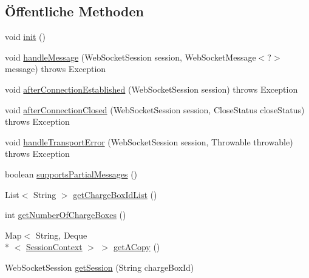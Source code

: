 \subsection*{Öffentliche Methoden}
\begin{DoxyCompactItemize}
\item 
void \hyperlink{classde_1_1rwth_1_1idsg_1_1steve_1_1ocpp_1_1ws_1_1_abstract_web_socket_endpoint_aef8362bd31120ca281b31b0e929b57d0}{init} ()
\item 
void \hyperlink{classde_1_1rwth_1_1idsg_1_1steve_1_1ocpp_1_1ws_1_1_abstract_web_socket_endpoint_af08f9d5fea93c492fa8a6e97f8131ccd}{handle\+Message} (Web\+Socket\+Session session, Web\+Socket\+Message$<$?$>$ message)  throws Exception 
\item 
void \hyperlink{classde_1_1rwth_1_1idsg_1_1steve_1_1ocpp_1_1ws_1_1_abstract_web_socket_endpoint_adc20166385a1af5646716aa0f6414f85}{after\+Connection\+Established} (Web\+Socket\+Session session)  throws Exception 
\item 
void \hyperlink{classde_1_1rwth_1_1idsg_1_1steve_1_1ocpp_1_1ws_1_1_abstract_web_socket_endpoint_aef2d9df6496b49e2981c3253760b2d69}{after\+Connection\+Closed} (Web\+Socket\+Session session, Close\+Status close\+Status)  throws Exception 
\item 
void \hyperlink{classde_1_1rwth_1_1idsg_1_1steve_1_1ocpp_1_1ws_1_1_abstract_web_socket_endpoint_a80a5c510b03fa4ce60c6642b9ad2c47d}{handle\+Transport\+Error} (Web\+Socket\+Session session, Throwable throwable)  throws Exception 
\item 
boolean \hyperlink{classde_1_1rwth_1_1idsg_1_1steve_1_1ocpp_1_1ws_1_1_abstract_web_socket_endpoint_ababd333016df11a6eb243cf87c27e329}{supports\+Partial\+Messages} ()
\item 
List$<$ String $>$ \hyperlink{classde_1_1rwth_1_1idsg_1_1steve_1_1ocpp_1_1ws_1_1_abstract_web_socket_endpoint_a8368ec501a410320c3725880bf79829e}{get\+Charge\+Box\+Id\+List} ()
\item 
int \hyperlink{classde_1_1rwth_1_1idsg_1_1steve_1_1ocpp_1_1ws_1_1_abstract_web_socket_endpoint_a863df404cd75c4804d6366076bef8b0a}{get\+Number\+Of\+Charge\+Boxes} ()
\item 
Map$<$ String, Deque\\*
$<$ \hyperlink{classde_1_1rwth_1_1idsg_1_1steve_1_1ocpp_1_1ws_1_1data_1_1_session_context}{Session\+Context} $>$ $>$ \hyperlink{classde_1_1rwth_1_1idsg_1_1steve_1_1ocpp_1_1ws_1_1_abstract_web_socket_endpoint_aef16fcbbf0c31be46115c81fc0738837}{get\+A\+Copy} ()
\item 
Web\+Socket\+Session \hyperlink{classde_1_1rwth_1_1idsg_1_1steve_1_1ocpp_1_1ws_1_1_abstract_web_socket_endpoint_afa20f380a780758a21d3bfa495987dfd}{get\+Session} (String charge\+Box\+Id)
\end{DoxyCompactItemize}

